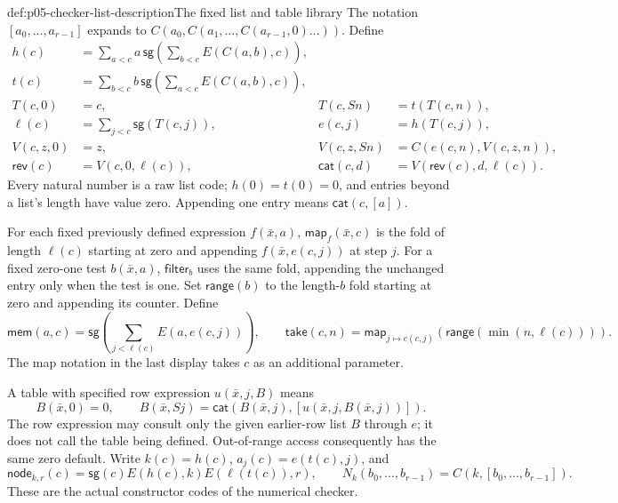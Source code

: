 \begin{hbdefinition}{def:p05-checker-list-description}{The fixed list and table library}
The notation \([a_0,\ldots,a_{r-1}]\) expands to
\(C(a_0,C(a_1,\ldots,C(a_{r-1},0)\ldots))\).  Define
\[
\begin{aligned}
 h(c)&=\sum_{a<c}a\,\mathsf{sg}\!\left(\sum_{b<c}E(C(a,b),c)\right),\\
 t(c)&=\sum_{b<c}b\,\mathsf{sg}\!\left(\sum_{a<c}E(C(a,b),c)\right),\\
 T(c,0)&=c,&T(c,Sn)&=t(T(c,n)),\\
 \ell(c)&=\sum_{j<c}\mathsf{sg}(T(c,j)),&
 e(c,j)&=h(T(c,j)),\\
 V(c,z,0)&=z,&V(c,z,Sn)&=C(e(c,n),V(c,z,n)),\\
 \mathsf{rev}(c)&=V(c,0,\ell(c)),&
 \mathsf{cat}(c,d)&=V(\mathsf{rev}(c),d,\ell(c)).
\end{aligned}
\]
Every natural number is a raw list code; \(h(0)=t(0)=0\), and entries
beyond a list's length have value zero.  Appending one entry means
\(\mathsf{cat}(c,[a])\).

For each fixed previously defined expression \(f(\bar x,a)\),
\(\mathsf{map}_f(\bar x,c)\) is the fold of length \(\ell(c)\)
starting at zero and appending \(f(\bar x,e(c,j))\) at step \(j\).
For a fixed zero-one test \(b(\bar x,a)\),
\(\mathsf{filter}_b\) uses the same fold, appending the unchanged entry
only when the test is one.  Set
\(\mathsf{range}(b)\) to the length-\(b\) fold starting at zero and
appending its counter.  Define
\[
 \mathsf{mem}(a,c)=\mathsf{sg}\!\left(\sum_{j<\ell(c)}E(a,e(c,j))\right),
 \qquad
 \mathsf{take}(c,n)=\mathsf{map}_{j\mapsto e(c,j)}
                   (\mathsf{range}(\min(n,\ell(c)))).
\]
The map notation in the last display takes \(c\) as an additional parameter.

A table with specified row expression \(u(\bar x,j,B)\) means
\[
 B(\bar x,0)=0,\qquad
 B(\bar x,Sj)=\mathsf{cat}
     (B(\bar x,j),[u(\bar x,j,B(\bar x,j))]).
\]
The row expression may consult only the given earlier-row list \(B\)
through \(e\); it does not call the table being defined.  Out-of-range
access consequently has the same zero default.  Write
\(k(c)=h(c)\), \(a_j(c)=e(t(c),j)\), and
\[
 \mathsf{node}_{k,r}(c)=\mathsf{sg}(c)E(h(c),k)E(\ell(t(c)),r),
 \qquad N_k(b_0,\ldots,b_{r-1})=C(k,[b_0,\ldots,b_{r-1}]).
\]
These are the actual constructor codes of the numerical checker.
\end{hbdefinition}

